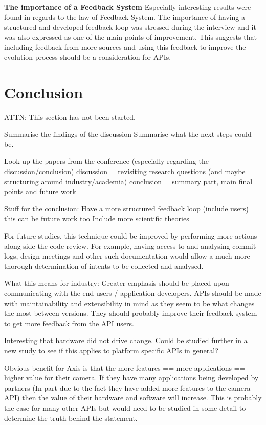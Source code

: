 \documentclass{sig-alternate}
\begin{document}
\smallskip \noindent
\textbf{The importance of a Feedback System  } %
Especially interesting results were found in regards to the law of Feedback System. The importance of having a structured and developed feedback loop was stressed during the interview and it was also expressed as one of the main points of improvement. This suggests that including feedback from more sources and using this feedback to improve the evolution process should be a consideration for APIs. 






\section{Conclusion} \label{conclusion}
ATTN: This section has not been started. 

Summarise the findings of the discussion
Summarise what the next steps could be.

Look up the papers from the conference (especially regarding the discussion/conclusion)
discussion = revisiting research questions (and maybe structuring around industry/academia)
conclusion = summary part, main final points and future work 

Stuff for the conclusion:
Have a more structured feedback loop (include users) this can be future work too
Include more scientific theories



For future studies, this technique could be improved by performing more actions along side the code review. For example, having access to and analysing commit logs, design meetings and other such documentation would allow a much more thorough determination of intents to be collected and analysed. %


       What this means for industry:
              Greater emphasis should be placed upon communicating with the end users / application developers. APIs should be made with maintainability and extensibility in mind as they seem to be what changes the most between versions. They should probably improve their feedback system to get more feedback from the API users.

              Interesting that hardware did not drive change. Could be studied further in a new study to see if this applies to platform specific APIs in general?

              Obvious benefit for Axis is that the more features == more applications == higher value for their camera. If they have many applications being developed by partners (In part due to the fact they have added more features to the camera API) then the value of their hardware and software will increase. This is probably the case for many other APIs but would need to be studied in some detail to determine the truth behind the statement.
\end{document}
